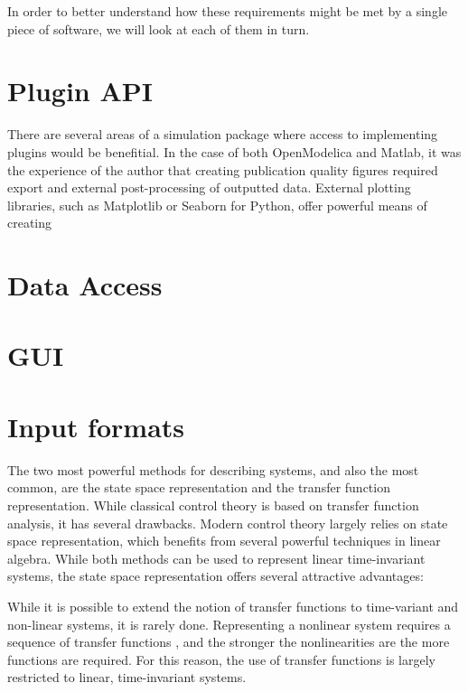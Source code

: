 \documentclass[\rootfolder/main.tex]{subfiles}
\begin{document}
In order to better understand how these requirements might be met by a single piece of software, we will look at each of them in turn.

\section{Plugin API}

There are several areas of a simulation package where access to implementing plugins would be benefitial.
In the case of both OpenModelica and Matlab, it was the experience of the author that creating publication quality figures required export and external post-processing of outputted data.
External plotting libraries, such as Matplotlib or Seaborn for Python, offer powerful means of creating 


\section{Data Access}

\section{GUI}

\section{Input formats}

The two most powerful methods for describing systems, and also the most common, are the state space representation and the transfer function representation.
While classical control theory is based on transfer function analysis, it has several drawbacks.
Modern control theory largely relies on state space representation, which benefits from several powerful techniques in linear algebra.
While both methods can be used to represent linear time-invariant systems, the state space representation offers several attractive advantages:

While it is possible to extend the notion of transfer functions to time-variant and non-linear systems, it is rarely done.
Representing a nonlinear system requires a sequence of transfer functions \cite{Zhang1993}, and the stronger the nonlinearities are the more functions are required.
For this reason, the use of transfer functions is largely restricted to linear, time-invariant systems.
\end{document}
